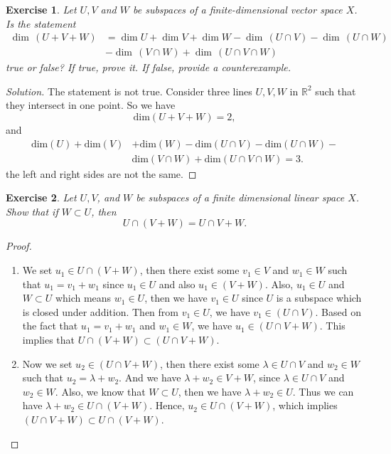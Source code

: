 \documentclass[11pt]{book}
\newtheorem{exercise}{Exercise}[section]
\theoremstyle{definition}
\numberwithin{equation}{chapter}
\begin{document}
\begin{exercise}\label{ex_2}
Let $U, V$ and $W$ be subspaces of a finite-dimensional vector space $X$. Is the statement
\begin{align*}
     \dim \,(U + V + W) & =  \dim  U +  \dim  V +  \dim  W -  \dim \,(U \cap V) -  \dim \,(U \cap W) \\
    & -  \dim \,(V \cap W) +  \dim \,(U \cap V \cap W)
\end{align*}
true or false? If true, prove it. If false, provide a counterexample.
\end{exercise}
\begin{proof}[Solution]
The statement is not true. Consider three lines $U,V,W$ in $\mathbb{R}^2$ such that they intersect in one point. So we have
$$\text{dim} (U+V+W) = 2,$$
and
\begin{align*}
   \text{dim}(U) + \text{dim}(V) & + \text{dim}(W) - \text{dim}(U \cap V) - \text{dim}(U \cap W) - \\
   & \text{dim}(V \cap W) + \text{dim}(U \cap V \cap W) = 3.
\end{align*}
the left and right sides are not the same. 
\end{proof}

\medskip

\begin{exercise}\label{ex_3}
Let $U, V$, and $W$ be subspaces of a finite dimensional linear space $X$. Show that if $W\subset U$, then 
$$U\cap (V + W) = U\cap V + W.$$
\end{exercise}
\begin{proof}
~\begin{enumerate}[label=(\alph*)]
    \item We set $u_1 \in U \cap (V+W)$, then there exist some $v_1 \in V$ and $w_1 \in W$ such that $u_1 = v_1 + w_1$ since $u_1 \in U$ and also $u_1 \in (V+W)$. Also, $u_1 \in U$ and $W \subset U$ which means $w_1 \in U$, then we have $v_1 \in U$ since $U$ is a subspace which is closed under addition. Then from $v_1 \in U$, we have $v_1 \in (U \cap V)$. Based on the fact that $u_1 = v_1 + w_1$ and $w_1 \in W$, we have $u_1 \in (U \cap V + W)$. This implies that $U \cap (V+W) \subset (U \cap V + W)$.
    \item Now we set $u_2 \in (U \cap V + W)$, then there exist some $\lambda \in U \cap V$ and $w_2 \in W$ such that $u_2 = \lambda + w_2$. And we have $\lambda + w_2 \in V+W$, since $\lambda \in U \cap V$ and $w_2 \in W$. Also, we know that $W \subset U$, then we have $\lambda + w_2 \in U$. Thus we can have $\lambda + w_2 \in U \cap (V+W)$. Hence, $u_2 \in U \cap (V+W)$, which implies $(U \cap V + W) \subset U \cap (V+W)$.
\end{enumerate}
\end{proof}
\end{document}
